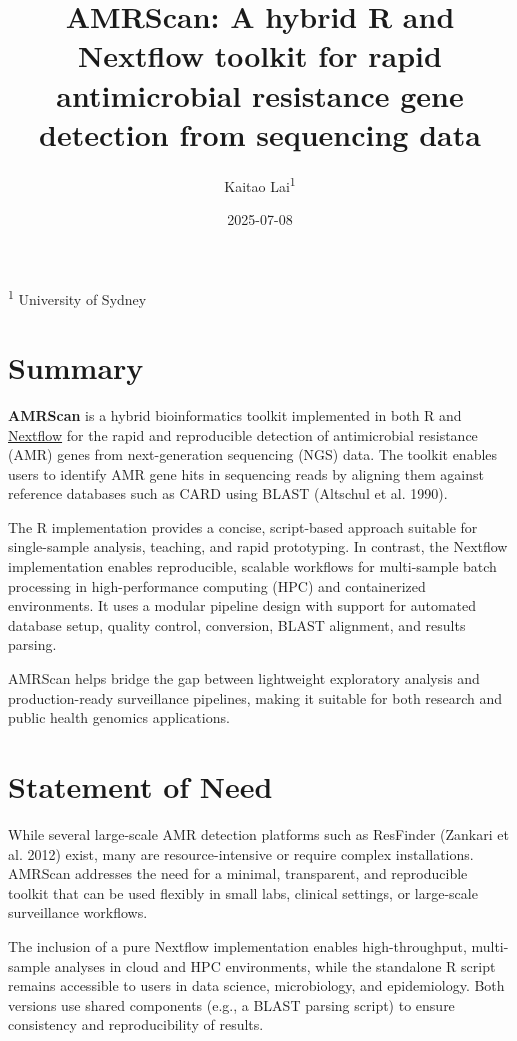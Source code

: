 \documentclass[
]{article}
\title{AMRScan: A hybrid R and Nextflow toolkit for rapid antimicrobial
resistance gene detection from sequencing data}
\author{Kaitao Lai\textsuperscript{1}}
\date{2025-07-08}
\begin{document}
\maketitle

\textsuperscript{1} University of Sydney

\section{Summary}\label{summary}

\textbf{AMRScan} is a hybrid bioinformatics toolkit implemented in both
R and \href{https://www.nextflow.io/}{Nextflow} for the rapid and
reproducible detection of antimicrobial resistance (AMR) genes from
next-generation sequencing (NGS) data. The toolkit enables users to
identify AMR gene hits in sequencing reads by aligning them against
reference databases such as CARD using BLAST (Altschul et al. 1990).

The R implementation provides a concise, script-based approach suitable
for single-sample analysis, teaching, and rapid prototyping. In
contrast, the Nextflow implementation enables reproducible, scalable
workflows for multi-sample batch processing in high-performance
computing (HPC) and containerized environments. It uses a modular
pipeline design with support for automated database setup, quality
control, conversion, BLAST alignment, and results parsing.

AMRScan helps bridge the gap between lightweight exploratory analysis
and production-ready surveillance pipelines, making it suitable for both
research and public health genomics applications.

\section{Statement of Need}\label{statement-of-need}

While several large-scale AMR detection platforms such as ResFinder
(Zankari et al. 2012) exist, many are resource-intensive or require
complex installations. AMRScan addresses the need for a minimal,
transparent, and reproducible toolkit that can be used flexibly in small
labs, clinical settings, or large-scale surveillance workflows.

The inclusion of a pure Nextflow implementation enables high-throughput,
multi-sample analyses in cloud and HPC environments, while the
standalone R script remains accessible to users in data science,
microbiology, and epidemiology. Both versions use shared components
(e.g., a BLAST parsing script) to ensure consistency and reproducibility
of results.
\end{document}
